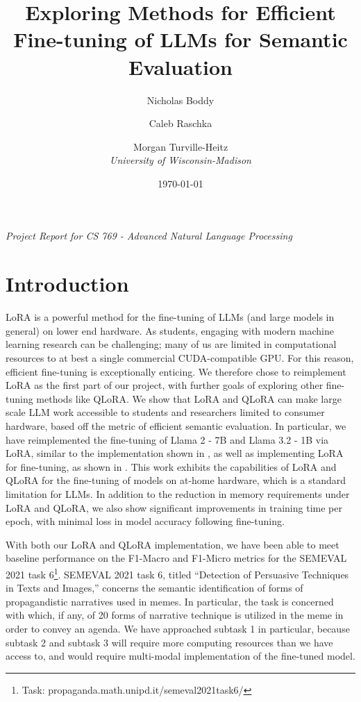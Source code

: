 \documentclass[11pt]{article}
\title{Exploring Methods for Efficient Fine-tuning of LLMs for Semantic Evaluation}
\author{
	Nicholas Boddy \and Caleb Raschka \and Morgan Turville-Heitz \\
	\textit{University of Wisconsin-Madison}
}
\date{\today}
\begin{document}
\maketitle

\begin{center}
	\textit{Project Report for CS 769 - Advanced Natural Language Processing}
\end{center}

\section{Introduction}

LoRA is a powerful method for the fine-tuning of LLMs (and large models in general) on lower end hardware. As students, engaging with modern machine learning research can be challenging; many of us are limited in computational resources to at best a single commercial CUDA-compatible GPU. For this reason, efficient fine-tuning is exceptionally enticing. We therefore chose to reimplement LoRA as the first part of our project, with further goals of exploring other fine-tuning methods like QLoRA. We show that LoRA and QLoRA can make large scale LLM work accessible to students and researchers limited to consumer hardware, based off the metric of efficient semantic evaluation. In particular, we have reimplemented the fine-tuning of Llama 2 - 7B and Llama 3.2 - 1B via LoRA, similar to the implementation shown in \cite{hu2021lora}, as well as implementing LoRA for fine-tuning, as shown in \cite{dettmers2023qlora}. This work exhibits the capabilities of LoRA and QLoRA for the fine-tuning of models on at-home hardware, which is a standard limitation for LLMs. In addition to the reduction in memory requirements under LoRA and QLoRA, we also show significant improvements in training time per epoch, with minimal loss in model accuracy following fine-tuning.

With both our LoRA and QLoRA implementation, we have been able to meet baseline performance on the F1-Macro and F1-Micro metrics for the SEMEVAL 2021 task 6\footnote{Task: propaganda.math.unipd.it/semeval2021task6/}. SEMEVAL 2021 task 6, titled “Detection of Persuasive Techniques in Texts and Images,” concerns the semantic identification of forms of propagandistic narratives used in memes. In particular, the task is concerned with which, if any, of 20 forms of narrative technique is utilized in the meme in order to convey an agenda. We have approached subtask 1 in particular, because subtask 2 and subtask 3 will require more computing resources than we have access to, and would require multi-modal implementation of the fine-tuned model.
\end{document}
